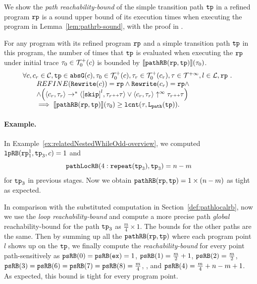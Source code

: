 We show the \emph{path reachability-bound} of the simple transition path $\mathtt{tp}$ in a refined program $\mathtt{rp}$ is a sound upper bound of its execution times when executing the program in Lemma~\ref{lem:pathrb-sound}, with the proof in .
\begin{lem}
  \label{lem:pathrb-sound}
  For any program with its refined program $\mathtt{rp}$ and a simple transition path $\mathtt{tp}$ in this program,
  the number of times that $\mathtt{tp}$ is evaluated when executing the $\mathtt{rp}$ under initial trace $\mathtt{\tau}_0 \in \mathcal{T}^{+}_0(c)$ is bounded by $\llbracket \mathtt{pathRB}(\mathtt{rp}, \mathtt{tp}) \rrbracket(\mathtt{\tau}_0)$.
  \[
    \begin{array}{l}
    \forall c, c_r \in \cdom, \tpath \in \absG(c), \trace_0 \in \ftdom_0(c),  \trace_r \in \ftdom_0(c_r), \trace \in \tdom, l \in \ldom, \rprog \sthat 
    \\ \qquad
    REFINE(\algrewrite(c)) = \rprog
    \land 
    \algrewrite(c_r) = \rprog
    \land
    \\ \qquad
    \land 
    \Big(
      \config{c_r, \trace_r} \rightarrow^* \config{\clabel{\eskip}^{l}, \trace_r \tracecat \trace}
      \lor \config{c_r, \trace_r} \uparrow^{\infty} \trace_r \tracecat \trace 
      \Big)
  \\ \qquad
    \implies
    \econfig{\inoutB(\rprog, \tpath)}(\trace_0) \geq \lcounter(\trace, \pathl(\tpath)).
    \end{array}
  \]  
\end{lem}
\paragraph{Example.}
In Example~\ref{ex:relatedNestedWhileOdd-overview}, we computed $\mathtt{lpRB}(\mathtt{rp}_1^1, \mathtt{tp}_3, c) = 1$ and
$$\mathtt{pathLocRB}(4: \mathtt{repeat}(\mathtt{tp}_3), \mathtt{tp}_3) = n - m$$ for $\mathtt{tp}_3$ in previous stages. Now we obtain $\mathtt{pathRB}(\mathtt{rp}, \mathtt{tp}) = 1 \times (n - m)$ as tight as expected.

In comparison with the substituted computation in Section~\ref{def:pathlocalrb}, now we use the \emph{loop reachability-bound}
and compute a more precise path \emph{global} reachability-bound for the path $\mathtt{tp}_3$ as $\frac{m}{4} \times 1$.
The bounds for the other paths are the same.
Then by summing up all the $\mathtt{pathRB}(\mathtt{rp}, \mathtt{tp})$ where each program point $l$ shows up on the $\mathtt{tp}$, we finally compute
the \emph{reachability-bound} for every point path-sensitively as
$\mathtt{psRB}(0) = \mathtt{psRB}(\mathtt{ex}) = 1$,
$\mathtt{psRB}(1) = \frac{m}{2} + 1$,
$\mathtt{psRB}(2) = \frac{m}{2} $, 
$\mathtt{psRB}(3) = \mathtt{psRB}(6) = \mathtt{psRB}(7)  = \mathtt{psRB}(8) = \frac{m}{4} $,
,
and $\mathtt{psRB}(4) =  \frac{m}{4} + n - m + 1$.
As expected, this bound is tight for every program point.